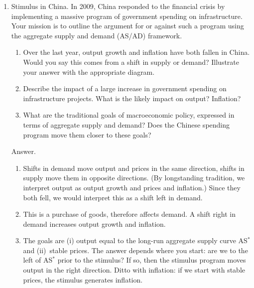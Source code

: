\documentclass[letterpaper,12pt]{article}
\begin{document}
\begin{enumerate}
\item Stimulus in China.
In 2009, China responded to the financial crisis by
implementing a massive program of government spending
on infrastructure.
Your mission is to outline the argument for or against such a program
using the aggregate supply and demand (AS/AD) framework.
%
\begin{enumerate}

\item Over the last year, output growth and inflation have both fallen in China.  Would you say this comes from a shift in supply or demand?
    Illustrate your answer with the appropriate diagram.

\item Describe the impact of
a large increase in government spending on infrastructure projects.
What is the likely impact on output?  Inflation?

\item What are the traditional goals of macroeconomic policy,
expressed in terms of aggregate supply and demand?
Does the Chinese spending program move them closer to these goals?
\end{enumerate}

Answer.
\begin{enumerate}
\item Shifts in demand move output and prices in the same direction,
shifts in supply move them in opposite directions.
(By longstanding tradition, we interpret output as output growth
and prices and inflation.)
Since they both fell, we would interpret this as a shift left in demand.

\item This is a purchase of goods, therefore affects demand.
A shift right in demand increases output growth and inflation.

\item The goals are (i) output equal to the long-run aggregate supply curve AS$^*$ and (ii)~stable prices.
    The answer depends where you start:  are we to the left of AS$^*$ prior to the stimulus?  If so, then the stimulus program moves
output in the right direction.
Ditto with inflation:  if we start with stable prices,
the stimulus generates inflation.
\end{enumerate}




\end{enumerate}
\end{document}
